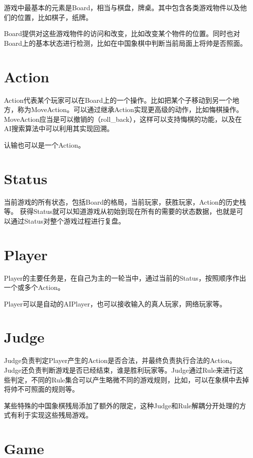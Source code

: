 \documentclass[export, 12pt, letterpaper]{ctexrep}
\begin{document}
游戏中最基本的元素是Board，相当与棋盘，牌桌。其中包含各类游戏物件以及他们的位置，比如棋子，纸牌。

Board提供对这些游戏物件的访问和改变，比如改变某个物件的位置。同时也对Board上的基本状态进行检测，比如在中国象棋中判断当前局面上将帅是否照面。

\section{Action}

Action代表某个玩家可以在Board上的一个操作。比如把某个子移动到另一个地方，称为MoveAction。可以通过继承Action实现更高级的动作，比如悔棋操作。MoveAction应当是可以撤销的（roll\_back），这样可以支持悔棋的功能，以及在AI搜索算法中可以利用其实现回溯。

认输也可以是一个Action。

\section{Status}

当前游戏的所有状态，包括Board的格局，当前玩家，获胜玩家，Action的历史栈等。
获得Status就可以知道游戏从初始到现在所有的需要的状态数据，也就是可以通过Status对整个游戏过程进行复盘。

\section{Player}

Player的主要任务是，在自己为主的一轮当中，通过当前的Status，按照顺序作出一个或多个Action。

Player可以是自动的AIPlayer，也可以接收输入的真人玩家，网络玩家等。

\section{Judge}

Judge负责判定Player产生的Action是否合法，并最终负责执行合法的Action。Judge还负责判断游戏是否已经结束，谁是胜利玩家等。Judge通过Rule来进行这些判定，不同的Rule集合可以产生略微不同的游戏规则，比如，可以在象棋中去掉将帅不可照面的规则等。

某些特殊的中国象棋残局添加了额外的限定，这种Judge和Rule解耦分开处理的方式有利于实现这些残局游戏。

\section{Game}
\end{document}
